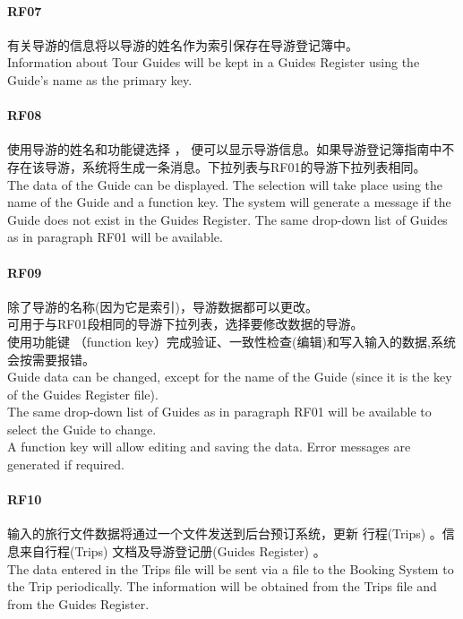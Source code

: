 \hypertarget{rf07}{%
\paragraph{RF07}\label{rf07}}

有关导游的信息将以导游的姓名作为索引保存在导游登记簿中。\\
Information about Tour Guides will be kept in a Guides Register using
the Guide's name as the primary key.

\hypertarget{rf08}{%
\paragraph{RF08}\label{rf08}}

使用导游的姓名和功能键选择 ，
便可以显示导游信息。如果导游登记簿指南中不存在该导游，系统将生成一条消息。下拉列表与RF01的导游下拉列表相同。\\
The data of the Guide can be displayed. The selection will take place
using the name of the Guide and a function key. The system will generate
a message if the Guide does not exist in the Guides Register. The same
drop-down list of Guides as in paragraph RF01 will be available.

\hypertarget{rf09}{%
\paragraph{RF09}\label{rf09}}

除了导游的名称(因为它是索引)，导游数据都可以更改。\\
可用于与RF01段相同的导游下拉列表，选择要修改数据的导游。\\
使用功能键 （function
key）完成验证、一致性检查(编辑)和写入输入的数据,系统会按需要报错。\\
Guide data can be changed, except for the name of the Guide (since it is
the key of the Guides Register file).\\
The same drop-down list of Guides as in paragraph RF01 will be available
to select the Guide to change.\\
A function key will allow editing and saving the data. Error messages
are generated if required.\\

\hypertarget{rf10}{%
\paragraph{RF10}\label{rf10}}

输入的旅行文件数据将通过一个文件发送到后台预订系统，更新 行程(Trips)
。信息来自行程(Trips) 文档及导游登记册(Guides Register) 。\\
The data entered in the Trips file will be sent via a file to the
Booking System to the Trip periodically. The information will be
obtained from the Trips file and from the Guides Register.

